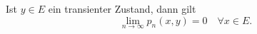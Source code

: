 \label{transienter Zustand dann lim n -> unendl. pn(x,y) = 0}
Ist $y \in E$ ein transienter Zustand, dann gilt
\begin{equation*}
\lim_{n \to \infty} p_{n}(x,y) = 0 \quad \forall x \in E.
\end{equation*}